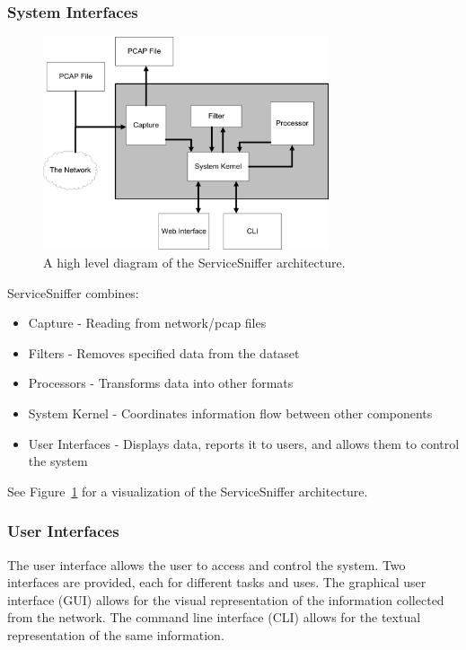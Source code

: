 \documentclass[titlepage]{article}
\begin{document}
\subsubsection{System Interfaces%
  \label{system-interfaces}%
}
\begin{figure}
    \centering
    \includegraphics[width=0.75\textwidth]{gfx/figure}
    \caption{A high level diagram of the ServiceSniffer architecture.}
    \label{g:system}
\end{figure}

ServiceSniffer combines:
\begin{itemize}
    \item Capture - Reading from network/pcap files
    \item Filters - Removes specified data from the dataset
    \item Processors - Transforms data into other formats
    \item System Kernel - Coordinates information flow between other components
    \item User Interfaces - Displays data, reports it to users, and allows them
        to control the system
\end{itemize}
See Figure~\ref{g:system} for a visualization of the ServiceSniffer
architecture.


\subsubsection{User Interfaces%
  \label{user-interfaces}%
}

The user interface allows the user to access and control the system. Two
interfaces are provided, each for different tasks and uses. The graphical user
interface (GUI) allows for the visual representation of the information
collected from the network. The command line interface (CLI) allows for the textual
representation of the same information.
\end{document}
